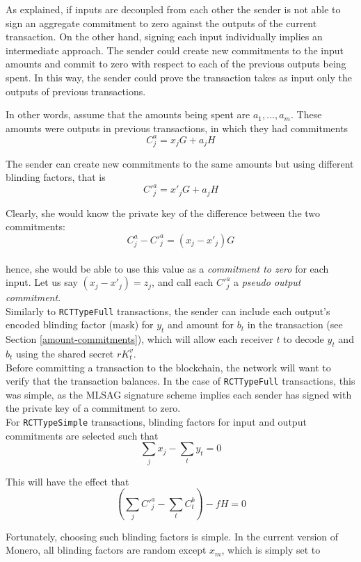 As explained, if inputs are decoupled from each other the sender is not able to sign an aggregate commitment to zero against the outputs of the current transaction. On the other hand, signing each input individually implies an intermediate approach. The sender could create new commitments to the input amounts and commit to zero with respect to each of the previous outputs being spent. In this way, the sender could prove the transaction takes as input only the outputs of previous transactions.

In other words, assume that the amounts being spent are \(a_1, ..., a_m\). These amounts were outputs in previous transactions, in which they had commitments\\
\[C^a_{j} = x_j G + a_j H\]


The sender can create new commitments to the same amounts but using different blinding factors, that is
\[C'^a_{j} = x'_j G + a_j H\]

Clearly, she would know the private key of the difference between the two commitments: \\
\[ C^a_{j} - C'^a_{j} = (x_j - x'_j) G \] \\
hence, she would be able to use this value as a {\em commitment to zero} for each input. Let us say $(x_j - x'_j) = z_j$, and call each $C'^a_j$ a {\em pseudo output commitment}.
\\

Similarly to {\tt RCTTypeFull} transactions, the sender can include each output’s encoded blinding factor (mask) for $y_t$ and amount for $b_t$ in the transaction (see Section \ref{amount-commitments}), which will allow each receiver $t$ to decode $y_t$ and $b_t$ using the shared secret $r K_t^v$.
\\

Before committing a transaction to the blockchain, the network will want to verify that the transaction balances. In the case of {\tt RCTTypeFull} transactions, this was simple, as the MLSAG signature scheme implies each sender has signed with the private key of a commitment to zero.
\\

For {\tt RCTTypeSimple} transactions, blinding factors for input and output commitments are selected such that
\[\sum_j x_j  - \sum_t y_t = 0  \]

This will have the effect that\\
\[ (\sum_j C'^a_{j} - \sum_t C^b_{t}) - f H = 0\]


Fortunately, choosing such blinding factors is simple. In the current version of Monero, all blinding factors are random except $x_m$, which is simply set to

